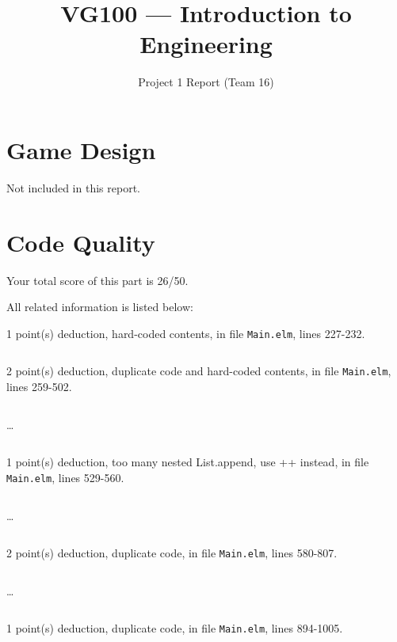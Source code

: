 \documentclass{article}
\title{VG100 --- Introduction to\\ Engineering}
\subtitle{Project 1 Report (Team 16)}
\begin{document}
\maketitle

\section{Game Design}

Not included in this report.

\section{Code Quality}

Your total score of this part is 26/50. \medskip

All related information is listed below: \medskip

1 point(s) {\color{red}deduction}, hard-coded contents, in file {\color{blue}\texttt{Main.elm}}, lines {\color{blue}227-232}.

\inputminted[firstline=227,lastline=232]{elm}{Main.elm}

2 point(s) {\color{red}deduction}, duplicate code and hard-coded contents, in file {\color{blue}\texttt{Main.elm}}, lines {\color{blue}259-502}.

\inputminted[firstline=259,lastline=268]{elm}{Main.elm}

\dots

\inputminted[firstline=493,lastline=502]{elm}{Main.elm}

1 point(s) {\color{red}deduction}, too many nested List.append, use ++ instead, in file {\color{blue}\texttt{Main.elm}}, lines {\color{blue}529-560}.

\inputminted[firstline=529,lastline=538]{elm}{Main.elm}

\dots

\inputminted[firstline=551,lastline=560]{elm}{Main.elm}

2 point(s) {\color{red}deduction}, duplicate code, in file {\color{blue}\texttt{Main.elm}}, lines {\color{blue}580-807}.

\inputminted[firstline=580,lastline=589]{elm}{Main.elm}

\dots

\inputminted[firstline=798,lastline=807]{elm}{Main.elm}

1 point(s) {\color{red}deduction}, duplicate code, in file {\color{blue}\texttt{Main.elm}}, lines {\color{blue}894-1005}.

\inputminted[firstline=894,lastline=903]{elm}{Main.elm}
\end{document}
